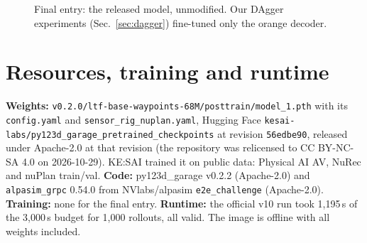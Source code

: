 \documentclass{article}
\begin{document}
\begin{figure}[h]
\centering
{}
\caption{Final entry: the released model, unmodified. Our DAgger experiments (Sec.~\ref{sec:dagger})
fine-tuned only the orange decoder.}
\label{fig:system}
\end{figure}

\section{Resources, training and runtime}
\textbf{Weights:} \texttt{v0.2.0/ltf-base-waypoints-68M/posttrain/model\_1.pth} with its \texttt{config.yaml} and
\texttt{sensor\_rig\_nuplan.yaml}, Hugging Face \texttt{kesai-labs/py123d\_garage\_pretrained\_checkpoints} at
revision \texttt{56edbe90}, released under Apache-2.0 at that revision (the repository was relicensed to
CC BY-NC-SA 4.0 on 2026-10-29). KE:SAI trained it on public data: Physical AI AV, NuRec and nuPlan train/val.
\textbf{Code:} py123d\_garage v0.2.2 (Apache-2.0) and \texttt{alpasim\_grpc} 0.54.0 from NVlabs/alpasim
\texttt{e2e\_challenge} (Apache-2.0). \textbf{Training:} none for the final entry. \textbf{Runtime:} the official
v10 run took 1,195\,s of the 3,000\,s budget for 1,000 rollouts, all valid. The image is offline with all weights included.
\end{document}
